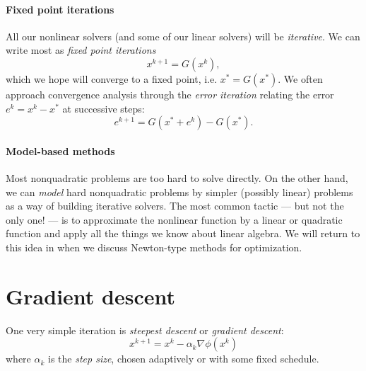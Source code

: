 \documentclass[12pt, leqno]{article} %
\begin{document}
\paragraph{Fixed point iterations}
All our nonlinear solvers (and some of our linear solvers) will be
{\em iterative}.  We can write most as {\em fixed point iterations}
\begin{equation}
  x^{k+1} = G(x^k), \label{eq:fixed-point}
\end{equation}
which we hope will converge to a fixed point, i.e. $x^* = G(x^*)$.
We often approach convergence analysis through the
{\em error iteration} relating the error $e^k = x^k-x^*$ at
successive steps:
\begin{equation}
  e^{k+1} = G(x^* + e^k)-G(x^*).
\end{equation}

\paragraph{Model-based methods}
Most nonquadratic problems are too hard to solve directly.  On the other
hand, we can {\em model} hard nonquadratic problems by simpler (possibly
linear) problems as a way of building iterative solvers.  The most
common tactic --- but not the only one! --- is to approximate the
nonlinear function by a linear or quadratic function and apply all the
things we know about linear algebra.  We will return to this idea in
when we discuss Newton-type methods for optimization.

\section{Gradient descent}

One very simple iteration is {\em steepest descent}
or {\em gradient descent}:
\begin{equation} \label{iter:gd}
  x^{k+1} = x^k - \alpha_k \nabla \phi(x^k)
\end{equation}
where $\alpha_k$ is the {\em step size}, chosen adaptively or
with some fixed schedule.
\end{document}
